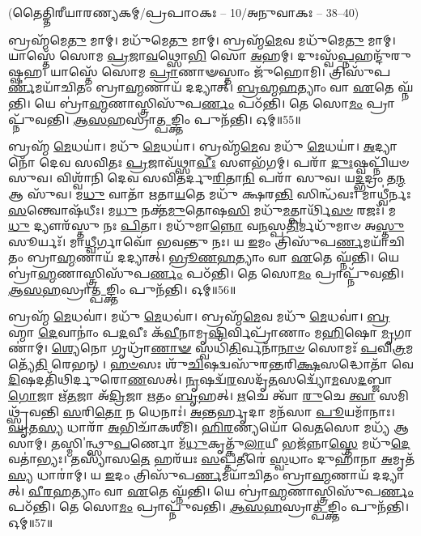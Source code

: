 

\vspace{-1ex}
\centerline{\scriptsize (𑌤𑍈𑌤𑍍𑌤𑌿𑌰𑍀𑌯𑌾𑌰𑌣𑍍𑌯𑌕𑌮𑍍/𑌪𑍍𑌰𑌪𑌾𑌠𑌕𑌃 – 10/𑌅𑌨𑍁𑌵𑌾𑌕𑌃 – 38–40)}
𑌬𑍍𑌰𑌹𑍍𑌮᳴𑌮𑍇\-\ul{𑌤𑍁} 𑌮𑌾𑌮𑍍। 𑌮𑌧𑍁᳴𑌮𑍇\-\ul{𑌤𑍁} 𑌮𑌾𑌮𑍍। 𑌬𑍍𑌰𑌹𑍍𑌮᳴\-\ul{𑌮𑍇}\-𑌵 𑌮𑌧𑍁᳴𑌮𑍇\-\ul{𑌤𑍁} 𑌮𑌾𑌮𑍍। 𑌯𑌾𑌸𑍍𑌤𑍇᳴ 𑌸𑍋𑌮 \ul{𑌪𑍍𑌰}\-𑌜𑌾\-\ul{𑌵}\-𑌥𑍍𑌸𑍋\-\ul{𑌭𑌿} 𑌸𑍋 \ul{𑌅}\-𑌹𑌮𑍍। 𑌦𑍁𑌃𑌸𑍍𑌵᳴\-\ul{𑌪𑍍𑌨}\-𑌹𑌨𑍍𑌦𑍁᳴𑌰𑍁𑌷𑍍𑌷𑌹। 𑌯𑌾𑌸𑍍𑌤𑍇᳴ 𑌸𑍋𑌮 \ul{𑌪𑍍𑌰𑌾}\-𑌣𑌾𑍟𑌸𑍍𑌤𑌾𑌂 𑌜𑍁᳴𑌹𑍋𑌮𑌿। 𑌤𑍍𑌰𑌿𑌸𑍁᳴𑌪\-\ul{𑌰𑍍𑌣}\-𑌮𑌯𑌾᳴𑌚𑌿𑌤𑌂 𑌬𑍍𑌰𑌾\-\ul{𑌹𑍍𑌮}\-𑌣𑌾𑌯᳴ 𑌦𑌦𑍍𑌯𑌾𑌤𑍍। \ul{𑌬𑍍𑌰}\-\-\ul{𑌹𑍍𑌮}\-\-\ul{𑌹}\-𑌤𑍍𑌯𑌾𑌂 𑌵𑌾 \ul{𑌏}\-𑌤𑍇 𑌘𑍍𑌨᳴𑌨𑍍𑌤𑌿। 𑌯𑍇 𑌬𑍍𑌰𑌾॑\-\ul{𑌹𑍍𑌮}\-𑌣𑌾𑌸𑍍𑌤𑍍𑌰𑌿𑌸𑍁᳴𑌪\-\ul{𑌰𑍍𑌣𑌂} 𑌪𑌠᳴𑌨𑍍𑌤𑌿। 𑌤𑍇 𑌸𑍋\-\ul{𑌮𑌂} 𑌪𑍍𑌰𑌾𑌪𑍍𑌨𑍁᳴𑌵𑌨𑍍𑌤𑌿। \ul{𑌆}\-\-\ul{𑌸}\-\-\ul{𑌹}\-𑌸𑍍𑌰𑌾\-\ul{𑌤𑍍𑌪}\-𑌙𑍍𑌕𑍍𑌤𑌿𑌂 𑌪𑍁𑌨᳴𑌨𑍍𑌤𑌿। 𑌓𑌮𑍍॥55॥

𑌬𑍍𑌰𑌹𑍍𑌮᳴ \ul{𑌮𑍇}\-𑌧𑌯𑌾॑। 𑌮𑌧𑍁᳴ \ul{𑌮𑍇}\-𑌧𑌯𑌾॑। 𑌬𑍍𑌰𑌹𑍍𑌮᳴\-\ul{𑌮𑍇}\-𑌵 𑌮𑌧𑍁᳴ \ul{𑌮𑍇}\-𑌧𑌯𑌾॑। \ul{𑌅}\-𑌦𑍍𑌯𑌾 𑌨𑍋᳴ 𑌦𑍇𑌵 𑌸𑌵𑌿𑌤𑌃 \ul{𑌪𑍍𑌰}\-𑌜𑌾𑌵᳴𑌥𑍍𑌸𑌾\-\ul{𑌵𑍀𑌃} 𑌸𑍗𑌭᳴𑌗𑌮𑍍। 𑌪𑌰𑌾᳴ \ul{𑌦𑍁𑌃}\-𑌷𑍍𑌵𑌪𑍍𑌨𑌿᳴𑌯𑍞 𑌸𑍁𑌵। 𑌵𑌿𑌶𑍍𑌵𑌾᳴𑌨𑌿 𑌦𑍇𑌵 𑌸𑌵𑌿𑌤𑌰𑍍𑌦𑍁\-\ul{𑌰𑌿}\-𑌤𑌾\-\ul{𑌨𑌿} 𑌪𑌰𑌾᳴ 𑌸𑍁𑌵। 𑌯\-\ul{𑌦𑍍𑌭}\-𑌦𑍍𑌰𑌂 𑌤\-\ul{𑌨𑍍𑌮} 𑌆 𑌸𑍁᳴𑌵। 𑌮\-\ul{𑌧𑍁} 𑌵𑌾𑌤𑌾᳴ 𑌋𑌤𑌾\-\ul{𑌯}\-𑌤𑍇 𑌮𑌧𑍁᳴ 𑌕𑍍𑌷𑌰\-\ul{𑌨𑍍𑌤𑌿} 𑌸𑌿𑌨𑍍𑌧᳴𑌵𑌃। 𑌮𑌾𑌧𑍍𑌵𑍀॑𑌰𑍍𑌨𑌃 \ul{𑌸}\-𑌨𑍍𑌤𑍍𑌵𑍋𑌷᳴𑌧𑍀𑌃। 𑌮\-\ul{𑌧𑍁} 𑌨𑌕𑍍𑌤᳴\-\ul{𑌮𑍁}\-𑌤𑍋𑌷\-\ul{𑌸𑌿} 𑌮𑌧𑍁᳴\-\ul{𑌮}\-𑌤𑍍𑌪𑌾𑌰𑍍𑌥𑌿᳴\-\ul{𑌵}\-\-\ul{𑍞} 𑌰𑌜𑌃᳴। 𑌮\-\ul{𑌧𑍁} 𑌦𑍍𑌯𑍗𑌰᳴𑌸𑍍𑌤𑍁 𑌨𑌃 \ul{𑌪𑌿}\-𑌤𑌾। 𑌮𑌧𑍁᳴𑌮𑌾\-\ul{𑌨𑍍𑌨𑍋} 𑌵\-\ul{𑌨}\-𑌸𑍍𑌪\-\ul{𑌤𑌿}\-𑌰𑍍𑌮𑌧𑍁᳴𑌮𑌾𑍞 𑌅\-\ul{𑌸𑍍𑌤𑍁} 𑌸𑍂𑌰𑍍𑌯𑌃᳴। 𑌮𑌾\-\ul{𑌧𑍍𑌵𑍀}\-𑌰𑍍𑌗𑌾𑌵𑍋᳴ 𑌭𑌵𑌨𑍍𑌤𑍁 𑌨𑌃। 𑌯 \ul{𑌇}\-𑌮𑌂 𑌤𑍍𑌰𑌿𑌸𑍁᳴𑌪\-\ul{𑌰𑍍𑌣}\-𑌮𑌯𑌾᳴𑌚𑌿𑌤𑌂 𑌬𑍍𑌰𑌾\-\ul{𑌹𑍍𑌮}\-𑌣𑌾𑌯᳴ 𑌦𑌦𑍍𑌯𑌾𑌤𑍍। \ul{𑌭𑍍𑌰𑍂}\-\-\ul{𑌣}\-\-\ul{𑌹}\-𑌤𑍍𑌯𑌾𑌂 𑌵𑌾 \ul{𑌏}\-𑌤𑍇 𑌘𑍍𑌨᳴𑌨𑍍𑌤𑌿। 𑌯𑍇 𑌬𑍍𑌰𑌾॑\-\ul{𑌹𑍍𑌮}\-𑌣𑌾𑌸𑍍𑌤𑍍𑌰𑌿𑌸𑍁᳴𑌪\-\ul{𑌰𑍍𑌣𑌂} 𑌪𑌠᳴𑌨𑍍𑌤𑌿। 𑌤𑍇 𑌸𑍋\-\ul{𑌮𑌂} 𑌪𑍍𑌰𑌾𑌪𑍍𑌨𑍁᳴𑌵𑌨𑍍𑌤𑌿। \ul{𑌆}\-\-\ul{𑌸}\-\-\ul{𑌹}\-𑌸𑍍𑌰𑌾\-\ul{𑌤𑍍𑌪}\-𑌙𑍍𑌕𑍍𑌤𑌿𑌂 𑌪𑍁𑌨᳴𑌨𑍍𑌤𑌿। 𑌓𑌮𑍍॥56॥

𑌬𑍍𑌰𑌹𑍍𑌮᳴ \ul{𑌮𑍇}\-𑌧𑌵𑌾॑। 𑌮𑌧𑍁᳴ \ul{𑌮𑍇}\-𑌧𑌵𑌾॑। 𑌬𑍍𑌰𑌹𑍍𑌮᳴\-\ul{𑌮𑍇}\-𑌵 𑌮𑌧𑍁᳴ \ul{𑌮𑍇}\-𑌧𑌵𑌾॑। \ul{𑌬𑍍𑌰}\-𑌹𑍍𑌮𑌾 \ul{𑌦𑍇}\-𑌵𑌾𑌨𑌾𑌂॑ 𑌪\-\ul{𑌦}\-𑌵𑍀𑌃 𑌕᳴\-\ul{𑌵𑍀}\-𑌨𑌾𑌮𑍃\-\ul{𑌷𑌿}\-𑌰𑍍𑌵𑌿𑌪𑍍𑌰𑌾᳴𑌣𑌾𑌂 𑌮\-\ul{𑌹𑌿}\-𑌷𑍋 \ul{𑌮𑍃}\-𑌗𑌾𑌣𑌾॑𑌮𑍍। \ul{𑌶𑍍𑌯𑍇}\-𑌨𑍋 𑌗𑍃𑌧𑍍𑌰𑌾᳴\-\ul{𑌣𑌾}\-\-\ul{𑍟} 𑌸𑍍𑌵𑌧𑌿᳴\-\ul{𑌤𑌿}\-𑌰𑍍𑌵𑌨𑌾᳴\-\ul{𑌨𑌾}\-\-\ul{𑍞} 𑌸𑍋𑌮𑌃᳴ \ul{𑌪}\-𑌵𑌿\-\ul{𑌤𑍍𑌰}\-𑌮𑌤𑍍𑌯𑍇᳴\-\ul{𑌤𑌿} 𑌰𑍇𑌭𑌨𑍍। \ul{𑌹}\-\-\ul{𑍞}\-𑌸𑌃 𑌶𑍁᳴\-\ul{𑌚𑌿}\-𑌷𑌦𑍍𑌵𑌸𑍁᳴𑌰𑌨𑍍𑌤𑌰𑌿\-\ul{𑌕𑍍𑌷}\-𑌸𑌦𑍍𑌧𑍋𑌤𑌾᳴ 𑌵𑍇\-\ul{𑌦𑌿}\-𑌷𑌦𑌤𑌿᳴𑌥𑌿𑌰𑍍𑌦𑍁𑌰𑍋\-\ul{𑌣}\-𑌸𑌤𑍍। \ul{𑌨𑍃}\-𑌷𑌦𑍍𑌵᳴\-\ul{𑌰}\-𑌸𑌦𑍃᳴\-\ul{𑌤}\-𑌸𑌦𑍍𑌵𑍍𑌯𑍋᳴\-\ul{𑌮}\-𑌸\-\ul{𑌦}\-𑌬𑍍𑌜𑌾 \ul{𑌗𑍋}\-𑌜𑌾 𑌋᳴\-\ul{𑌤}\-𑌜𑌾 𑌅᳴\-\ul{𑌦𑍍𑌰𑌿}\-𑌜𑌾 \ul{𑌋}\-𑌤𑌂 \ul{𑌬𑍃}\-𑌹𑌤𑍍। \ul{𑌋}\-𑌚𑍇 𑌤𑍍𑌵𑌾᳴ \ul{𑌰𑍁}\-𑌚𑍇 \ul{𑌤𑍍𑌵𑌾} 𑌸𑌮𑌿𑌥𑍍𑌸𑍍𑌰᳴𑌵𑌨𑍍𑌤𑌿 \ul{𑌸}\-𑌰𑌿\-\ul{𑌤𑍋} 𑌨 𑌧𑍇𑌨𑌾𑌃॑। \ul{𑌅}\-𑌨𑍍𑌤𑌰𑍍\mbox{}\-\ul{𑌹𑍃}\-𑌦𑌾 𑌮𑌨᳴𑌸𑌾 \ul{𑌪𑍂}\-𑌯𑌮𑌾᳴𑌨𑌾𑌃। \ul{𑌘𑍃}\-𑌤\-\ul{𑌸𑍍𑌯} 𑌧𑌾𑌰𑌾᳴ \ul{𑌅}\-𑌭𑌿𑌚𑌾᳴𑌕𑌶𑍀𑌮𑌿। \ul{𑌹𑌿}\-\-\ul{𑌰}\-𑌣𑍍𑌯𑌯𑍋᳴ 𑌵𑍇\-\ul{𑌤}\-𑌸𑍋 𑌮𑌧𑍍𑌯᳴ 𑌆𑌸𑌾𑌮𑍍। \mbox{𑌤𑌸𑍍𑌮𑌿 ॑\hspace{-1.25ex}𑌨𑍍𑌥𑍍𑌸𑍁}\-\-\ul{𑌪}\-𑌰𑍍𑌣𑍋 𑌮᳴\-\ul{𑌧𑍁}\-𑌕𑍃𑌤𑍍𑌕𑍁᳴\-\ul{𑌲𑌾}\-𑌯𑍀 𑌭𑌜᳴𑌨𑍍𑌨𑌾\-\ul{𑌸𑍍𑌤𑍇} 𑌮𑌧𑍁᳴\-\-\ul{𑌦𑍇}\-𑌵𑌤𑌾॑𑌭𑍍𑌯𑌃। 𑌤𑌸𑍍𑌯𑌾᳴𑌸\-\ul{𑌤𑍇} 𑌹𑌰᳴𑌯𑌃 \ul{𑌸}\-𑌪𑍍𑌤𑌤𑍀𑌰𑍇॑ \ul{𑌸𑍍𑌵}\-𑌧𑌾𑌂 𑌦𑍁𑌹𑌾᳴𑌨𑌾 \ul{𑌅}\-𑌮𑍃𑌤᳴\-\ul{𑌸𑍍𑌯} 𑌧𑌾𑌰𑌾॑𑌮𑍍। 𑌯 \ul{𑌇}\-𑌦𑌂 𑌤𑍍𑌰𑌿𑌸𑍁᳴𑌪\-\ul{𑌰𑍍𑌣}\-𑌮𑌯𑌾᳴𑌚𑌿𑌤𑌂 𑌬𑍍𑌰𑌾\-\ul{𑌹𑍍𑌮}\-𑌣𑌾𑌯᳴ 𑌦𑌦𑍍𑌯𑌾𑌤𑍍। \ul{𑌵𑍀}\-\-\ul{𑌰}\-\-\ul{𑌹}\-𑌤𑍍𑌯𑌾𑌂 𑌵𑌾 \ul{𑌏}\-𑌤𑍇 𑌘𑍍𑌨᳴𑌨𑍍𑌤𑌿। 𑌯𑍇 𑌬𑍍𑌰𑌾॑\-\ul{𑌹𑍍𑌮}\-𑌣𑌾𑌸𑍍𑌤𑍍𑌰𑌿𑌸𑍁᳴𑌪\-\ul{𑌰𑍍𑌣𑌂} 𑌪𑌠᳴𑌨𑍍𑌤𑌿। 𑌤𑍇 𑌸𑍋\-\ul{𑌮𑌂} 𑌪𑍍𑌰𑌾𑌪𑍍𑌨𑍁᳴𑌵𑌨𑍍𑌤𑌿। \ul{𑌆}\-\-\ul{𑌸}\-\-\ul{𑌹}\-𑌸𑍍𑌰𑌾\-\ul{𑌤𑍍𑌪}\-𑌙𑍍𑌕𑍍𑌤𑌿𑌂 𑌪𑍁𑌨᳴𑌨𑍍𑌤𑌿। 𑌓𑌮𑍍॥57॥

